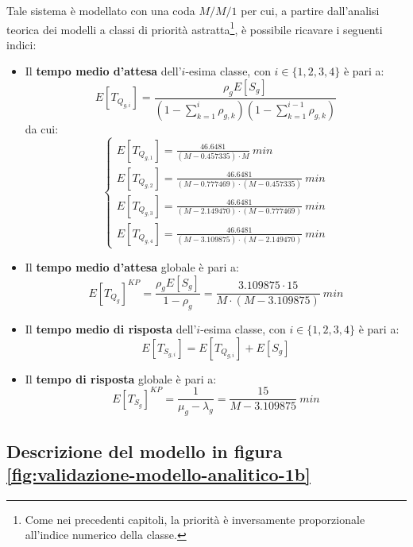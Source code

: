 Tale sistema è modellato con una coda $M/M/1$ per cui, a partire dall'analisi teorica dei modelli a classi di priorità astratta\footnote{\label{note:validazione-1}Come nei precedenti capitoli, la priorità è inversamente proporzionale all'indice numerico della classe.}, è possibile ricavare i seguenti indici:
\begin{itemize}
\item Il \textbf{tempo medio d'attesa} dell'$i$-esima classe, con $i\in\lbrace 1, 2, 3, 4\rbrace$ è pari a:
\begin{equation}
E[T_{Q_{g,i}}] = \frac{\rho_g E[S_g]}{\left(1- \sum_{k=1}^{i} \rho_{g,k}\right)\left(1- \sum_{k=1}^{i-1} \rho_{g,k}\right)}
\end{equation}
da cui:
\begin{equation}
\begin{cases}
E[T_{Q_{g,1}}] = \frac{46.6481}{(M-0.457335)\cdot M}\ min \\[1.5em]
E[T_{Q_{g,2}}] = \frac{46.6481}{(M-0.777469)\cdot(M-0.457335)}\ min \\[1em]
E[T_{Q_{g,3}}] = \frac{46.6481}{(M-2.149470)\cdot(M-0.777469)}\ min \\[1em]
E[T_{Q_{g,4}}] = \frac{46.6481}{(M-3.109875)\cdot(M-2.149470)}\ min
\end{cases}
\end{equation}
\item Il \textbf{tempo medio d'attesa} globale è pari a:
\begin{equation}
\label{eqn:validazione-modello-analitico-11}
E[T_{Q_g}]^{KP} = \frac{\rho_g E[S_g]}{1-\rho_g} = \frac{3.109875\cdot 15}{M\cdot (M-3.109875)}\ min
\end{equation}
\item Il \textbf{tempo medio di risposta} dell'$i$-esima classe, con $i\in\lbrace 1, 2, 3, 4\rbrace$ è pari a:
\begin{equation}
E[T_{S_{g,i}}] = E[T_{Q_{g,i}}] + E[S_g]
\end{equation}
\item Il \textbf{tempo di risposta} globale è pari a:
\begin{equation}
\label{eqn:validazione-modello-analitico-13}
E[T_{S_g}]^{KP} = \frac{1}{\mu_g - \lambda_g} = \frac{15}{M-3.109875}\ min
\end{equation}
\end{itemize}



\subsection{Descrizione del modello in figura \ref{fig:validazione-modello-analitico-1b}}

